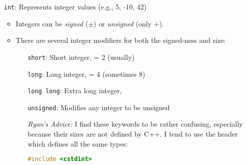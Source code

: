\documentclass{article}
\begin{document}
\begin{itemize}
	\item[\textcolor{BurntOrange}{\texttt{int}}:] Represents integer values (e.g., 5, -10, 42)
	\begin{itemize}
		\item Integers can be \textit{signed} ($\pm$) or \textit{unsigned} (only $+$).
		\item There are several integer modifiers for both the signed-ness and size:
		\begin{itemize}
			\item[\textcolor{BurntOrange}{\texttt{short}}:] Short integer,  = 2 (usually)
			\item[\textcolor{BurntOrange}{\texttt{long}}:] Long integer,  = 4 (sometimes 8)
			\item[\textcolor{BurntOrange}{\texttt{long long}}:] Extra long integer, 
			\item[\textcolor{BurntOrange}{\texttt{unsigned}}:] Modifies any integer to be unsigned
			\item[] \textsl{Ryan's Advice:} I find these keywords to be rather confusing, especially because their sizes are not defined by C++. I tend to use the  header which defines all the same types:
\begin{lstlisting}[language=C++]
#include <cstdint>


\end{lstlisting}
\end{itemize}
\end{itemize}
\end{itemize}
\end{document}
